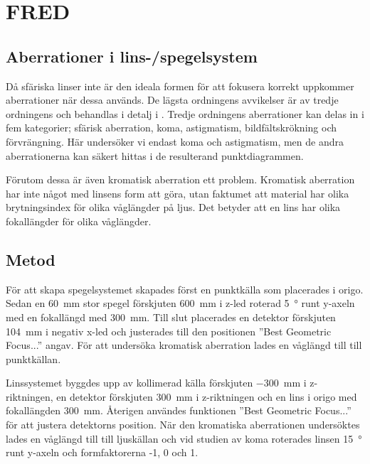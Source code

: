 \documentclass[a4paper]{article}
\begin{document}
\section{FRED}


\subsection{Aberrationer i lins-/spegelsystem}

Då sfäriska linser inte är den ideala formen för att fokusera korrekt uppkommer aberrationer när dessa används. De lägsta ordningens avvikelser är av tredje ordningens och behandlas i detalj i \cite[Kapitel~20]{pearsonIntroOpt}. Tredje ordningens aberrationer kan delas in i fem kategorier; sfärisk aberration, koma, astigmatism, bildfältskrökning och förvrängning. Här undersöker vi endast koma och astigmatism, men de andra aberrationerna kan säkert hittas i de resulterand punktdiagrammen.

Förutom dessa är även kromatisk aberration ett problem. Kromatisk aberration har inte något med linsens form att göra, utan faktumet att material har olika brytningsindex för olika våglängder på ljus. Det betyder att en lins har olika fokallängder för olika våglängder.

\subsection{Metod}

För att skapa spegelsystemet skapades först en punktkälla som placerades i origo. Sedan en \SI{60}{\milli\meter} stor spegel förskjuten \SI{600}{\milli\meter} i z-led roterad \SI{5}{\degree} runt y-axeln med en fokallängd med \SI{300}{\milli\meter}. Till slut placerades en detektor förskjuten \SI{104}{\milli\meter} i negativ x-led och justerades till den positionen ”Best Geometric Focus...” angav. För att undersöka kromatisk aberration lades en våglängd till till punktkällan.

Linssystemet byggdes upp av kollimerad källa förskjuten \SI{-300}{\milli\meter} i z-riktningen, en detektor förskjuten \SI{300}{\milli\meter} i z-riktningen och en lins i origo med fokallängden \SI{300}{\milli\meter}. Återigen användes funktionen ”Best Geometric Focus...” för att justera detektorns position. När den kromatiska aberrationen undersöktes lades en våglängd till till ljuskällan och vid studien av koma roterades linsen \SI{15}{\degree} runt y-axeln och formfaktorerna -1, 0 och 1.
\end{document}
